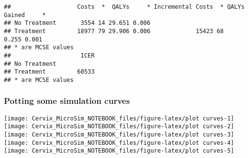 \documentclass[
]{article}
\begin{document}
\begin{verbatim}
##                   Costs  *  QALYs     * Incremental Costs  * QALYs Gained     *
## No Treatment       3554 14 29.651 0.006                                        
## Treatment         18977 79 29.906 0.006             15423 68        0.255 0.001
## * are MCSE values                                                              
##                    ICER
## No Treatment           
## Treatment         60533
## * are MCSE values
\end{verbatim}

\hypertarget{potting-some-simulation-curves}{%
\subsubsection{Potting some simulation
curves}\label{potting-some-simulation-curves}}

\texttt{[image: Cervix\_MicroSim\_NOTEBOOK\_files/figure-latex/plot curves-1]}
\texttt{[image: Cervix\_MicroSim\_NOTEBOOK\_files/figure-latex/plot curves-2]}
\texttt{[image: Cervix\_MicroSim\_NOTEBOOK\_files/figure-latex/plot curves-3]}
\texttt{[image: Cervix\_MicroSim\_NOTEBOOK\_files/figure-latex/plot curves-4]}
\texttt{[image: Cervix\_MicroSim\_NOTEBOOK\_files/figure-latex/plot curves-5]}
\end{document}
